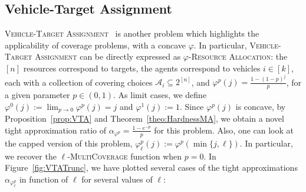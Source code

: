 \subsection{Vehicle-Target Assignment}
\label{subsection:vehicle-target}
\textsc{Vehicle-Target Assignment}~\cite{Murphey00,PM19} is another problem which highlights the applicability of coverage problems, with a concave $\varphi$. In particular, \textsc{Vehicle-Target Assignment} can be directly expressed as $\varphi$-\textsc{Resource Allocation}: the $[n]$ resources correspond to targets, the agents correspond to vehicles $i \in [k]$, each  with a collection of covering choices $\mathcal{A}_i \subseteq 2^{[n]}$, and $\varphi^p(j) = \frac{1-(1-p)^j}{p}$, for a given parameter $p \in (0,1)$. As limit cases, we define $\varphi^0(j) := \lim_{p \rightarrow 0} \varphi^p(j) = j$ and $\varphi^1(j) := 1$. Since $\varphi^p(j)$ is concave, by Proposition~\ref{prop:VTA} and Theorem~\ref{theo:HardnessMA}, we obtain a novel tight approximation ratio of $\alpha_{\varphi^p} = \frac{1 - e^{-p}}{p}$ for this problem. Also, one can look at the capped version of this problem, $\varphi^p_{\ell}(j) := \varphi^p(\min\{j,\ell\})$. In particular, we recover the $\ell$-\textsc{MultiCoverage} function when $p=0$. In Figure~\ref{fig:VTATrunc}, we have plotted several cases of the tight approximations $\alpha_{\varphi^p_{\ell}}$ in function of $\ell$ for several values of $\ell$:

